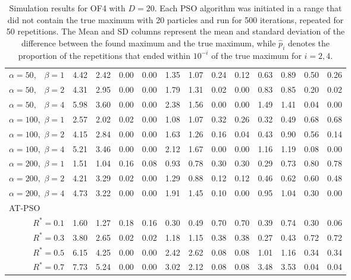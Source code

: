 \documentclass[12pt]{article}
\begin{document}
\begin{appendix}
\begin{table}[ht]
{\begin{tabular}{r|rrrr|rrrr|rrrr}
  $\alpha = 50,\enspace$ $\beta =1$ & 4.42 & 2.42 & 0.00 & 0.00 & 1.35 & 1.07 & 0.24 & 0.12 & 0.63 & 0.89 & 0.50 & 0.26 \\ 
  $\alpha = 50,\enspace$ $\beta =2$ & 4.31 & 2.95 & 0.00 & 0.00 & 1.79 & 1.31 & 0.02 & 0.00 & 0.83 & 0.85 & 0.20 & 0.02 \\ 
  $\alpha = 50,\enspace$ $\beta =4$ & 5.98 & 3.60 & 0.00 & 0.00 & 2.38 & 1.56 & 0.00 & 0.00 & 1.49 & 1.41 & 0.04 & 0.00 \\ 
  $\alpha = 100,$ $\beta =1$ & 2.57 & 2.02 & 0.02 & 0.00 & 1.08 & 1.07 & 0.32 & 0.26 & 0.32 & 0.49 & 0.68 & 0.68 \\ 
  $\alpha = 100,$ $\beta =2$ & 4.15 & 2.84 & 0.00 & 0.00 & 1.63 & 1.26 & 0.16 & 0.04 & 0.43 & 0.90 & 0.56 & 0.14 \\ 
  $\alpha = 100,$ $\beta =4$ & 5.21 & 3.46 & 0.00 & 0.00 & 2.12 & 1.67 & 0.00 & 0.00 & 1.16 & 1.19 & 0.08 & 0.00 \\ 
  $\alpha = 200,$ $\beta =1$ & 1.51 & 1.04 & 0.16 & 0.08 & 0.93 & 0.78 & 0.30 & 0.30 & 0.29 & 0.73 & 0.80 & 0.78 \\ 
  $\alpha = 200,$ $\beta =2$ & 4.21 & 3.29 & 0.02 & 0.00 & 1.29 & 0.88 & 0.12 & 0.12 & 0.46 & 0.62 & 0.60 & 0.48 \\ 
  $\alpha = 200,$ $\beta =4$ & 4.73 & 3.22 & 0.00 & 0.00 & 1.91 & 1.45 & 0.10 & 0.00 & 0.95 & 1.04 & 0.30 & 0.00 \\ 
\hline
\multicolumn{1}{l|}{AT-PSO} &&&&&&&&&&&&\\
  $R^* = 0.1$ & 1.60 & 1.27 & 0.18 & 0.16 & 0.30 & 0.49 & 0.70 & 0.70 & 0.39 & 0.74 & 0.30 & 0.06 \\ 
  $R^* = 0.3$ & 3.80 & 2.65 & 0.02 & 0.02 & 1.18 & 1.15 & 0.38 & 0.38 & 0.27 & 0.43 & 0.72 & 0.72 \\ 
  $R^* = 0.5$ & 6.15 & 4.25 & 0.00 & 0.00 & 2.42 & 2.62 & 0.08 & 0.08 & 1.01 & 1.16 & 0.34 & 0.34 \\ 
  $R^* = 0.7$ & 7.73 & 5.24 & 0.00 & 0.00 & 3.02 & 2.12 & 0.08 & 0.08 & 3.48 & 3.53 & 0.04 & 0.04 \\ 
   \hline
\end{tabular}
}
\caption{Simulation results for OF4 with $D=20$. Each PSO algorithm was initiated in a range that did not contain the true maximum with 20 particles and run for 500 iterations, repeated for 50 repetitions. The Mean and SD columns represent the mean and standard deviation of the difference between the found maximum and the true maximum, while $\widehat{p}_i$ denotes the proportion of the repetitions that ended within $10^{-i}$ of the true maximum for $i=2,4$.}

\end{table}
\end{appendix}
\end{document}
